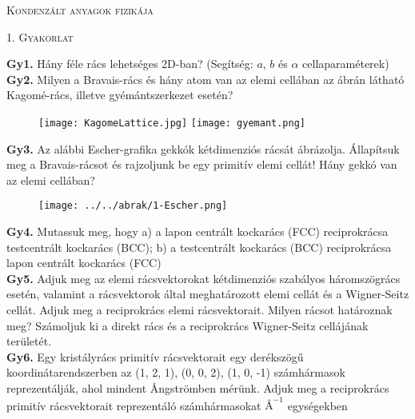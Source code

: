 \documentclass[12pt]{article}
\begin{document}
\centerline{
\textsc{\Large{ Kondenzált anyagok fizikája}}
}
\centerline{ 
\textsc{\large{1. Gyakorlat}}
}
\vspace{10mm}
\textbf{Gy1.} Hány féle rács lehetséges 2D-ban? (Segítség: $a$, $b$ és $\alpha$  cellaparaméterek)
\\

\textbf{Gy2.} Milyen a Bravais-rács és hány atom van az elemi cellában az ábrán látható Kagomé-rács, illetve gyémántszerkezet esetén?

\begin{figure}[h!]

\begin{center}


\texttt{[image: KagomeLattice.jpg]} \hspace{10mm}
\texttt{[image: gyemant.png]}
\end{center}
\end{figure}

\textbf{Gy3.} Az alábbi Escher-grafika gekkók kétdimenziós rácsát ábrázolja. Állapítsuk meg a Bravais-rácsot és rajzoljunk be egy primitív elemi cellát! Hány gekkó van az elemi cellában?
\begin{figure}[h!]
\begin{center}
\texttt{[image: ../../abrak/1-Escher.png]}
\end{center}
\end{figure}

\textbf{Gy4.} Mutassuk meg, hogy 
a) a lapon centrált kockarács (FCC) reciprokrácsa testcentrált kockarács (BCC);
b) a testcentrált kockarács (BCC) reciprokrácsa lapon centrált kockarács (FCC)
\\

\textbf{Gy5.} Adjuk  meg  az  elemi  rácsvektorokat kétdimenziós  szabályos háromszögrács esetén,  valamint  a  rácsvektorok  által  meghatározott  elemi  cellát  és  a Wigner-Seitz  cellát.  Adjuk  meg  a reciprokrács elemi rácsvektorait. Milyen rácsot határoznak meg? Számoljuk ki a direkt rács és a reciprokrács Wigner-Seitz cellájának területét.
\\

\textbf{Gy6.} Egy kristályrács primitív rácsvektorait egy derékszögű koordinátarendszerben az (1, 2, 1), (0, 0, 2), (1, 0, -1) számhármasok reprezentálják, ahol mindent $\si{\angstrom}$ngströmben mérünk. Adjuk meg a reciprokrács primitív rácsvektorait reprezentáló számhármasokat $\si{\angstrom}^{-1}$ egységekben
\end{document}
